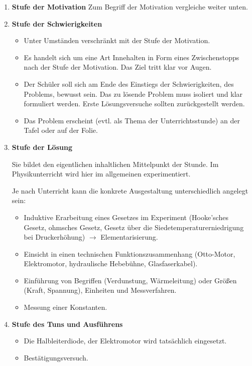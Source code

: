 \begin{enumerate}
	\item {\bf Stufe der Motivation} Zum Begriff der Motivation
	vergleiche weiter unten.
	
	\item {\bf Stufe der Schwierigkeiten}
	\begin{itemize}
		\item Unter Umst\"{a}nden verschr\"{a}nkt mit der Stufe der Motivation.
		\item Es handelt sich um eine Art Innehalten in Form eines
		Zwischenstopps nach der Stufe der Motivation.
		Das Ziel tritt klar vor Augen.
		\item Der Sch\"{u}ler soll sich am Ende des Einstiegs der
		Schwierigkeiten, des Problems, bewusst sein.
		Das zu l\"{o}sende Problem muss isoliert und klar formuliert werden.
		Erste L\"{o}sungsversuche sollten zur\"{u}ckgestellt werden.
		\item Das Problem erscheint
		(evtl. als Thema der Unterrichtsstunde)
		an der Tafel oder auf der Folie.
		\autocite[S. 207]{BleichrothDahnckeJung}
	\end{itemize}
	
	\item {\bf Stufe der L\"{o}sung}
	
	Sie bildet den eigentlichen inhaltlichen Mittelpunkt der Stunde.
	Im Physikunterricht wird hier im allgemeinen experimentiert.
	
	Je nach Unterricht kann die konkrete Ausgestaltung
	unterschiedlich angelegt sein:
	
	\begin{itemize}
		\item Induktive Erarbeitung eines Gesetzes im Experiment
		(Hooke'sches Gesetz, ohmsches Gesetz, Gesetz \"{u}ber die Siedetemperaturerniedrigung bei Druckerh\"{o}hung)
		$\to$ Elementarisierung.
		\item Einsicht in einen technischen Funktionszusammenhang
		(Otto-Motor, Elektromotor, hydraulische Hebeb\"{u}hne, Glasfaserkabel).
		\item Einf\"{u}hrung von Begriffen (Verdunstung, W\"{a}rmeleitung) oder
		Gr\"{o}{\ss}en (Kraft, Spannung), Einheiten und Messverfahren.
		\item Messung einer Konstanten.
	\end{itemize}
	
	\item {\bf Stufe des Tuns und Ausf\"{u}hrens}
	\begin{itemize}
		\item Die Halbleiterdiode, der Elektromotor wird tats\"{a}chlich eingesetzt.
		\item Best\"{a}tigungsversuch.
	\end{itemize}
	

\end{enumerate}
